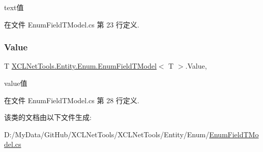 text值 



在文件 Enum\+Field\+T\+Model.\+cs 第 23 行定义.

\mbox{\label{class_x_c_l_net_tools_1_1_entity_1_1_enum_1_1_enum_field_t_model_a0b6e9efa5eb3b809fdc2bbb675a4e8e3}} 
\subsubsection{\texorpdfstring{Value}{Value}}
{\footnotesize\ttfamily T \hyperlink{class_x_c_l_net_tools_1_1_entity_1_1_enum_1_1_enum_field_t_model}{X\+C\+L\+Net\+Tools.\+Entity.\+Enum.\+Enum\+Field\+T\+Model}$<$ T $>$.Value\hspace{0.3cm}{\ttfamily [get]}, {\ttfamily [set]}}



value值 



在文件 Enum\+Field\+T\+Model.\+cs 第 28 行定义.



该类的文档由以下文件生成\+:\begin{DoxyCompactItemize}
\item 
D\+:/\+My\+Data/\+Git\+Hub/\+X\+C\+L\+Net\+Tools/\+X\+C\+L\+Net\+Tools/\+Entity/\+Enum/\hyperlink{_enum_field_t_model_8cs}{Enum\+Field\+T\+Model.\+cs}\end{DoxyCompactItemize}

